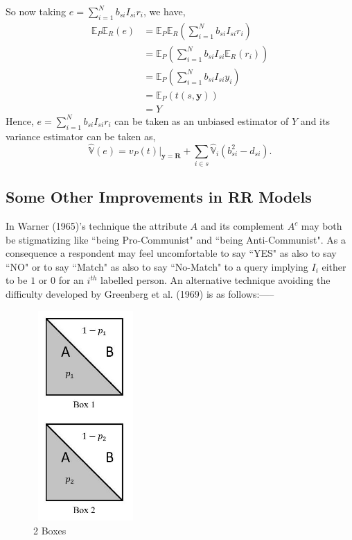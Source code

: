 \documentclass[12pt]{article}
\newcommand{\E}{\mathbb{E}}
\newcommand{\Var}{\mathbb{V}}
\theoremstyle{definition}
\begin{document}
So now taking $e =\displaystyle\sum_{i=1}^N b_{si}I_{si}r_i$, we have,
\begin{align*}
    \E_P\E_R(e) & = \E_P\E_R\left(\sum_{i=1}^N b_{si}I_{si}r_i\right)\\
    & = \E_P\left(\sum_{i=1}^N b_{si}I_{si}\E_R(r_i)\right)\\
    & = \E_P\left(\sum_{i=1}^N b_{si}I_{si}y_i\right)\\
    & = \E_P(t(s,\mathbf{y}))\\
    & = Y
\end{align*}
Hence, $e=\displaystyle\sum_{i=1}^N b_{si}I_{si}r_i$ can be taken as an unbiased estimator of $Y$ and its variance estimator can be taken as,
$$\hat{\Var}(e)=\left.v_P(t)\right|_{\mathbf{y}=\mathbf{R}}+\sum_{i\in s} \hat{\Var}_i (b_{si}^2-d_{si}).$$

\subsection{Some Other Improvements in RR Models}

In Warner (1965)'s technique the attribute $A$ and its complement $A^c$ may both be stigmatizing like ``being Pro-Communist" and ``being Anti-Communist". As a consequence a respondent may feel uncomfortable to say ``YES" as also to say ``NO" or to say ``Match" as also to say ``No-Match" to a query implying $I_i$ either to be $1$ or $0$ for an $i^{th}$ labelled person. An alternative technique avoiding the difficulty developed by Greenberg et al. (1969) is as follows:-----

\begin{figure}
\centering
\includegraphics[width=4cm, height= 8cm]{SS figures/SS3.JPG}
\caption{2 Boxes}\label{SS3}
\end{figure}
\end{document}
